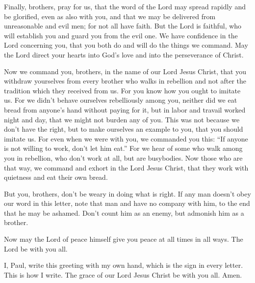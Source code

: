  Finally, brothers, pray for us, that the word of the Lord
may spread rapidly and be glorified, even as also with you,
 and that we may be delivered from unreasonable and evil
men; for not all have faith.  But the Lord is faithful,
who will establish you and guard you from the evil one. 
We have confidence in the Lord concerning you, that you both do and will
do the things we command.  May the Lord direct your hearts
into God's love and into the perseverance of Christ.

 Now we command you, brothers, in the name of our Lord
Jesus Christ, that you withdraw yourselves from every brother who walks
in rebellion and not after the tradition which they received from us.
 For you know how you ought to imitate us. For we didn't
behave ourselves rebelliously among you,  neither did we
eat bread from anyone's hand without paying for it, but in labor and
travail worked night and day, that we might not burden any of you.
 This was not because we don't have the right, but to make
ourselves an example to you, that you should imitate us. 
For even when we were with you, we commanded you this: ``If anyone is
not willing to work, don't let him eat.''  For we hear of
some who walk among you in rebellion, who don't work at all, but are
busybodies.  Now those who are that way, we command and
exhort in the Lord Jesus Christ, that they work with quietness and eat
their own bread.

 But you, brothers, don't be weary in doing what is
right.  If any man doesn't obey our word in this letter,
note that man and have no company with him, to the end that he may be
ashamed.  Don't count him as an enemy, but admonish him
as a brother.

 Now may the Lord of peace himself give you peace at all
times in all ways. The Lord be with you all.

 I, Paul, write this greeting with my own hand, which is
the sign in every letter. This is how I write.  The grace
of our Lord Jesus Christ be with you all. Amen.
